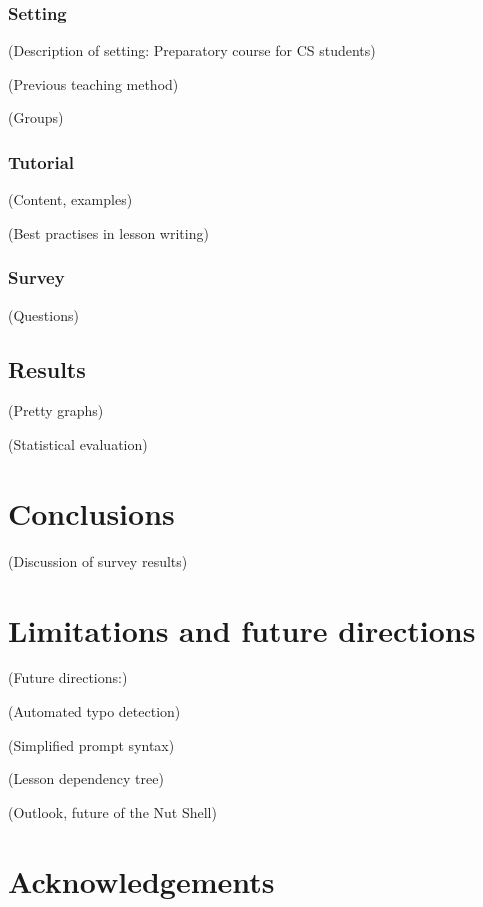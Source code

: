\documentclass[twoside]{scrreprt}
\begin{document}
\subsection{Setting}

                (Description of setting: Preparatory course for CS students)

                (Previous teaching method)

                (Groups)

\subsection{Tutorial}

                (Content, examples)

                (Best practises in lesson writing)

\subsection{Survey}

                (Questions)

\section{Results}

            (Pretty graphs)

            (Statistical evaluation)

\chapter{Conclusions}

        (Discussion of survey results)

\chapter{Limitations and future directions}

        (Future directions:)

            (Automated typo detection)

            (Simplified prompt syntax)

            (Lesson dependency tree)

        (Outlook, future of the Nut Shell)

\chapter{Acknowledgements}
\end{document}
